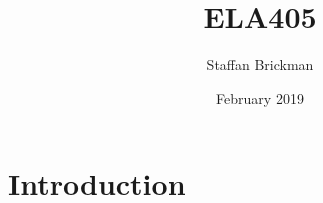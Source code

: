 \documentclass{article}
\title{ELA405}
\author{Staffan Brickman}
\date{February 2019}
\begin{document}
\maketitle

\section{Introduction}
\end{document}
